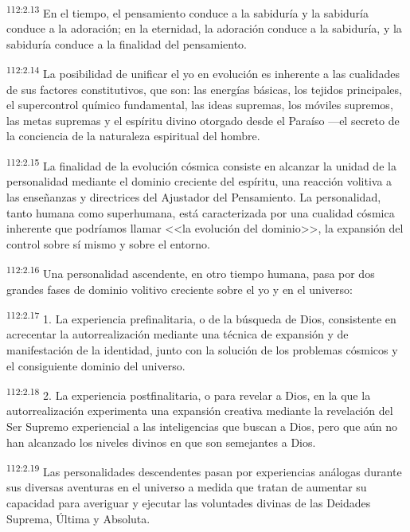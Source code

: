 \documentclass[twoside, 11pt]{book}
\begin{document}
\par
\textsuperscript{112:2.13} En el tiempo, el pensamiento conduce a la sabiduría y la sabiduría conduce a la adoración; en la eternidad, la adoración conduce a la sabiduría, y la sabiduría conduce a la finalidad del pensamiento.

\par
\textsuperscript{112:2.14} La posibilidad de unificar el yo en evolución es inherente a las cualidades de sus factores constitutivos, que son: las energías básicas, los tejidos principales, el supercontrol químico fundamental, las ideas supremas, los móviles supremos, las metas supremas y el espíritu divino otorgado desde el Paraíso ---el secreto de la conciencia de la naturaleza espiritual del hombre.

\par
\textsuperscript{112:2.15} La finalidad de la evolución cósmica consiste en alcanzar la unidad de la personalidad mediante el dominio creciente del espíritu, una reacción volitiva a las enseñanzas y directrices del Ajustador del Pensamiento. La personalidad, tanto humana como superhumana, está caracterizada por una cualidad cósmica inherente que podríamos llamar <<la evolución del dominio>>, la expansión del control sobre sí mismo y sobre el entorno.

\par
\textsuperscript{112:2.16} Una personalidad ascendente, en otro tiempo humana, pasa por dos grandes fases de dominio volitivo creciente sobre el yo y en el universo:

\par
\textsuperscript{112:2.17} 1. La experiencia prefinalitaria, o de la búsqueda de Dios, consistente en acrecentar la autorrealización mediante una técnica de expansión y de manifestación de la identidad, junto con la solución de los problemas cósmicos y el consiguiente dominio del universo.

\par
\textsuperscript{112:2.18} 2. La experiencia postfinalitaria, o para revelar a Dios, en la que la autorrealización experimenta una expansión creativa mediante la revelación del Ser Supremo experiencial a las inteligencias que buscan a Dios, pero que aún no han alcanzado los niveles divinos en que son semejantes a Dios.

\par
\textsuperscript{112:2.19} Las personalidades descendentes pasan por experiencias análogas durante sus diversas aventuras en el universo a medida que tratan de aumentar su capacidad para averiguar y ejecutar las voluntades divinas de las Deidades Suprema, Última y Absoluta.
\end{document}
